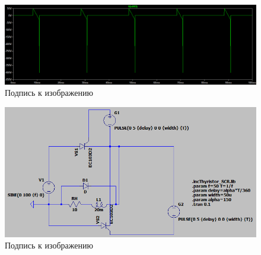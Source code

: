 \documentclass[a4paper, 12pt]{article}
\begin{document}
    \begin{figure}[H]
        \centering
        \includegraphics[scale=0.45]{a150_L20m.png}
        \captionsetup{skip=0pt}
        \caption{Подпись к изображению}
        \label{fig:a150_L20m}
    \end{figure}


    \begin{figure}[H]
        \centering
        \includegraphics[scale=0.5]{scheme3.png}
        \captionsetup{skip=0pt}
        \caption{Подпись к изображению}
        \label{fig:scheme3}
    \end{figure}
\end{document}
